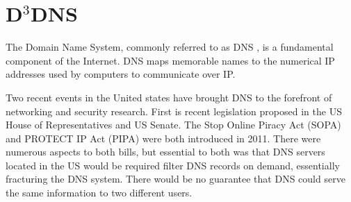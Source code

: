 \chapter{D$^{3}$DNS}
\label{chapter:d3ns}
	
%	
%	
%	
	
	
	


The Domain Name System, commonly referred to as DNS \cite{mockapetris2003rfc} \cite{mockapetris2004rfc}, is a fundamental component of the Internet.  DNS maps memorable names to the numerical IP addresses used by computers to communicate over IP. 

Two recent events in the United states have brought DNS to the forefront of networking and security research.  First is recent legislation proposed in the US House of Representatives and US Senate. The Stop Online Piracy Act (SOPA) \cite{sopa} and PROTECT IP Act (PIPA) \cite{pipa} were both introduced in 2011.  There were numerous aspects to both bills, but essential to both was that DNS servers located in the US would be required filter DNS records on demand, essentially fracturing the DNS system.  There would be no guarantee that DNS could serve the same information to two different users.

